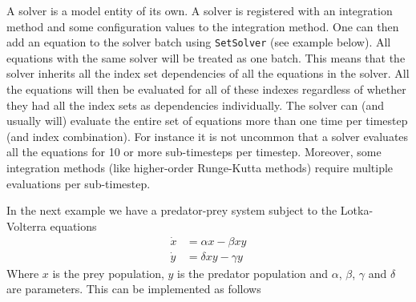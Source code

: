 \documentclass[11pt]{article}
\theoremstyle{definition}
\begin{document}
A solver is a model entity of its own. A solver is registered with an integration method and some configuration values to the integration method. One can then add an equation to the solver batch using {\tt SetSolver} (see example below). All equations with the same solver will be treated as one batch. This means that the solver inherits all the index set dependencies of all the equations in the solver. All the equations will then be evaluated for all of these indexes regardless of whether they had all the index sets as dependencies individually. The solver can (and usually will) evaluate the entire set of equations more than one time per timestep (and index combination). For instance it is not uncommon that a solver evaluates all the equations for 10 or more sub-timesteps per timestep. Moreover, some integration methods (like higher-order Runge-Kutta methods) require multiple evaluations per sub-timestep.

In the next example we have a predator-prey system subject to the Lotka-Volterra equations
\begin{align*}
\dot{x} &= \alpha x - \beta xy\\
\dot{y} &= \delta xy - \gamma y
\end{align*}
Where $x$ is the prey population, $y$ is the predator population and $\alpha$, $\beta$, $\gamma$ and $\delta$ are parameters. This can be implemented as follows
\end{document}
